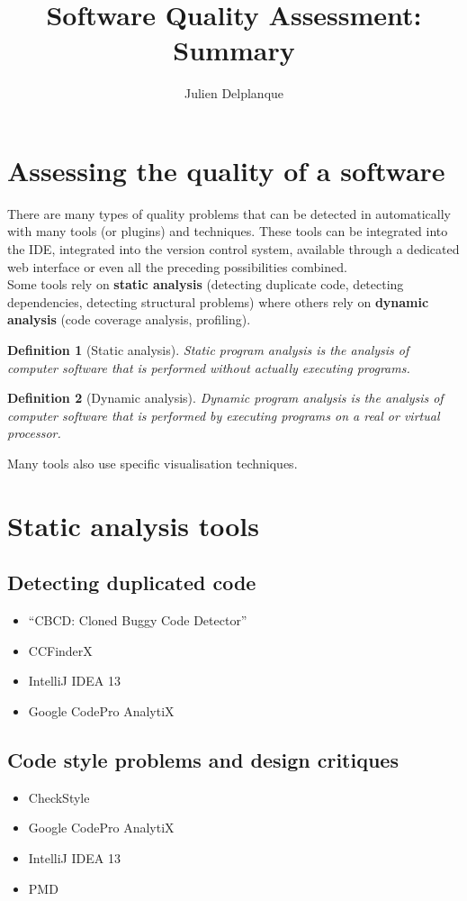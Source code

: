 \documentclass[a4paper,11pt]{report}
\title{Software Quality Assessment: Summary}
\author{Julien Delplanque}
\newtheorem{definition}{Definition}
\begin{document}
\maketitle
\newpage

\section{Assessing the quality of a software}
There are many types of quality problems that can be detected in automatically
with many tools (or plugins) and techniques. These tools can be integrated into
the IDE, integrated into the version control system, available through a
dedicated web interface or even all the preceding possibilities combined.\\

Some tools rely on \textbf{static analysis} (detecting duplicate code, detecting
dependencies, detecting structural problems) where others rely on
\textbf{dynamic analysis} (code coverage analysis, profiling).

\begin{definition}[Static analysis]
Static program analysis is the analysis of computer software that is performed
without actually executing programs.
\end{definition}

\begin{definition}[Dynamic analysis]
Dynamic program analysis is the analysis of computer software that is performed
by executing programs on a real or virtual processor.
\end{definition}

Many tools also use specific visualisation techniques.

\section{Static analysis tools}
\subsection{Detecting duplicated code}
\begin{itemize}
\item ``CBCD: Cloned Buggy Code Detector''
\item CCFinderX
\item IntelliJ IDEA 13
\item Google CodePro AnalytiX
\end{itemize}

\subsection{Code style problems and design critiques}
\begin{itemize}
\item CheckStyle
\item Google CodePro AnalytiX
\item IntelliJ IDEA 13
\item PMD
\end{itemize}
\end{document}
